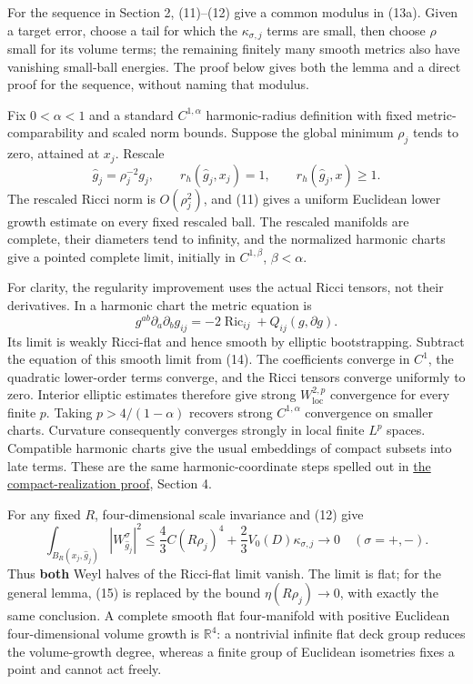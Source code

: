 \documentclass[
  11pt,
]{article}
\begin{document}
For the sequence in Section 2, (11)--(12) give a common modulus in
(13a). Given a target error, choose a tail for which the
\(\kappa_{\sigma,j}\) terms are small, then choose \(\rho\) small for
its volume terms; the remaining finitely many smooth metrics also have
vanishing small-ball energies. The proof below gives both the lemma and
a direct proof for the sequence, without naming that modulus.

Fix \(0<\alpha<1\) and a standard \(C^{1,\alpha}\) harmonic-radius
definition with fixed metric-comparability and scaled norm bounds.
Suppose the global minimum \(\rho_j\) tends to zero, attained at
\(x_j\). Rescale \[
 \widehat g_j=\rho_j^{-2}g_j,
 \qquad r_h(\widehat g_j,x_j)=1,
 \qquad r_h(\widehat g_j,x)\ge1.
 \tag{13}
\] The rescaled Ricci norm is \(O(\rho_j^2)\), and (11) gives a uniform
Euclidean lower growth estimate on every fixed rescaled ball. The
rescaled manifolds are complete, their diameters tend to infinity, and
the normalized harmonic charts give a pointed complete limit, initially
in \(C^{1,\beta}\), \(\beta<\alpha\).

For clarity, the regularity improvement uses the actual Ricci tensors,
not their derivatives. In a harmonic chart the metric equation is \[
 g^{ab}\partial_a\partial_b g_{ij}
       =-2\operatorname{Ric}_{ij}+Q_{ij}(g,\partial g).
 \tag{14}
\] Its limit is weakly Ricci-flat and hence smooth by elliptic
bootstrapping. Subtract the equation of this smooth limit from (14). The
coefficients converge in \(C^1\), the quadratic lower-order terms
converge, and the Ricci tensors converge uniformly to zero. Interior
elliptic estimates therefore give strong \(W^{2,p}_{\mathrm{loc}}\)
convergence for every finite \(p\). Taking \(p>4/(1-\alpha)\) recovers
strong \(C^{1,\alpha}\) convergence on smaller charts. Curvature
consequently converges strongly in local finite \(L^p\) spaces.
Compatible harmonic charts give the usual embeddings of compact subsets
into late terms. These are the same harmonic-coordinate steps spelled
out in \href{20260923_compact_realization.md}{the compact-realization
proof}, Section 4.

For any fixed \(R\), four-dimensional scale invariance and (12) give \[
 \int_{B_R(x_j,\widehat g_j)}|W^\sigma_{\widehat g_j}|^2
 \le \frac43C(R\rho_j)^4
       +\frac23V_0(D)\kappa_{\sigma,j}\longrightarrow0
       \quad(\sigma=+,-).
 \tag{15}
\] Thus \textbf{both} Weyl halves of the Ricci-flat limit vanish. The
limit is flat; for the general lemma, (15) is replaced by the bound
\(\eta(R\rho_j)\to0\), with exactly the same conclusion. A complete
smooth flat four-manifold with positive Euclidean four-dimensional
volume growth is \(\mathbb R^4\): a nontrivial infinite flat deck group
reduces the volume-growth degree, whereas a finite group of Euclidean
isometries fixes a point and cannot act freely.
\end{document}
